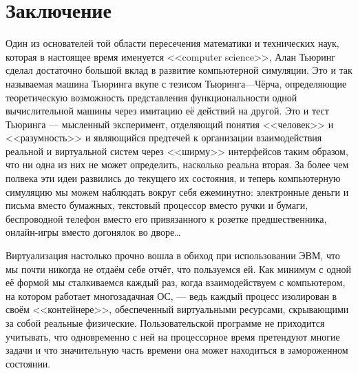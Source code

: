 \chapter{Заключение}\label{afterword}



Один из основателей той области пересечения математики и технических наук, которая в настоящее время именуется <<computer science>>, Алан Тьюринг сделал достаточно большой вклад в развитие компьютерной симуляции. Это и так называемая машина Тьюринга вкупе с тезисом Тьюринга---Чёрча, определяющие теоретическую возможность представления функциональности одной вычислительной машины через имитацию её действий на другой. Это и тест Тьюринга --- мысленный эксперимент, отделяющий понятия <<человек>> и <<разумность>> и являющийся предтечей к  организации взаимодействия реальной и виртуальной систем через <<ширму>> интерфейсов таким образом, что ни одна из них не может определить, насколько реальна вторая. За более чем полвека эти идеи развились до текущего их состояния, и теперь компьютерную симуляцию мы можем наблюдать вокруг себя ежеминутно: электронные деньги и письма вместо бумажных, текстовый процессор вместо ручки и бумаги, беспроводной телефон вместо его привязанного к розетке предшественника, онлайн-игры вместо догонялок во дворе\dots

Виртуализация настолько прочно вошла в обиход при использовании ЭВМ, что мы почти никогда не отдаём себе отчёт, что пользуемся ей. Как минимум с одной её формой мы сталкиваемся каждый раз, когда взаимодействуем с компьютером, на котором работает многозадачная ОС, --- ведь каждый процесс изолирован в своём <<контейнере>>, обеспеченный виртуальными ресурсами, скрывающими за собой реальные физические. Пользовательской программе не приходится учитывать, что одновременно с ней на процессорное время претендуют многие задачи и что значительную часть времени она может находиться в замороженном состоянии.

